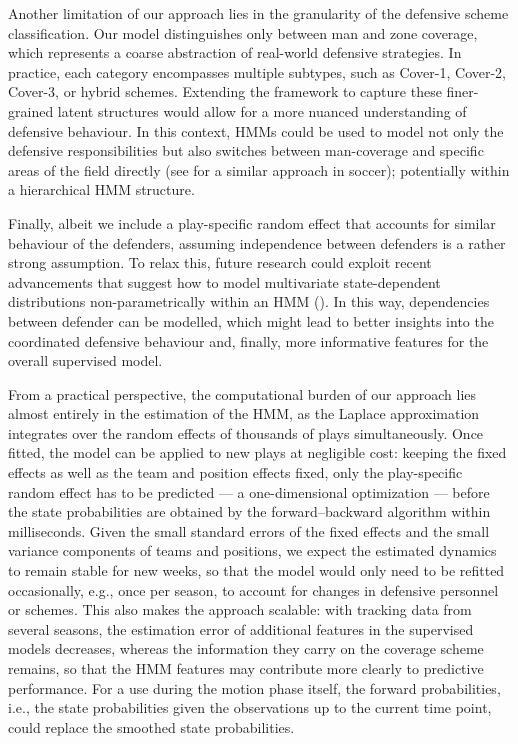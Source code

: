 \documentclass[namedate,webpdf,modern,medium]{oup-authoring-template}
\begin{document}
Another limitation of our approach lies in the granularity of the defensive scheme classification. Our model distinguishes only between man and zone coverage, which represents a coarse abstraction of real-world defensive strategies. In practice, each category encompasses multiple subtypes, such as Cover-1, Cover-2, Cover-3, or hybrid schemes. Extending the framework to capture these finer-grained latent structures would allow for a more nuanced understanding of defensive behaviour. In this context, HMMs could be used to model not only the defensive responsibilities but also switches between man-coverage and specific areas of the field directly (see \citealp{groom} for a similar approach in soccer); potentially within a hierarchical HMM structure.

Finally, albeit we include a play-specific random effect that accounts for similar behaviour of the defenders, assuming independence between defenders is a rather strong assumption. To relax this, future research could exploit recent advancements that suggest how to model multivariate state-dependent distributions non-parametrically within an HMM (\citealp{koslik2025tensor, michels2025nonparametric}). In this way, dependencies between defender can be modelled, which might lead to better insights into the coordinated defensive behaviour and, finally, more informative features for the overall supervised model.

From a practical perspective, the computational burden of our approach lies almost entirely in the estimation of the HMM, as the Laplace approximation integrates over the random effects of thousands of plays simultaneously. Once fitted, the model can be applied to new plays at negligible cost: keeping the fixed effects as well as the team and position effects fixed, only the play-specific random effect has to be predicted --- a one-dimensional optimization --- before the state probabilities are obtained by the forward--backward algorithm within milliseconds. Given the small standard errors of the fixed effects and the small variance components of teams and positions, we expect the estimated dynamics to remain stable for new weeks, so that the model would only need to be refitted occasionally, e.g., once per season, to account for changes in defensive personnel or schemes. This also makes the approach scalable: with tracking data from several seasons, the estimation error of additional features in the supervised models decreases, whereas the information they carry on the coverage scheme remains, so that the HMM features may contribute more clearly to predictive performance. For a use during the motion phase itself, the forward probabilities, i.e., the state probabilities given the observations up to the current time point, could replace the smoothed state probabilities.
\end{document}
